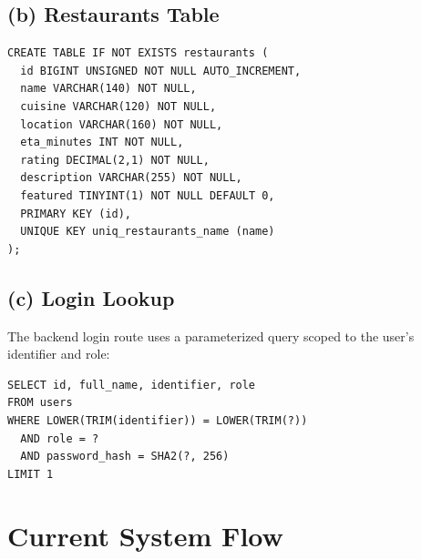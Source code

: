 \subsection*{(b) Restaurants Table}

\begin{tcolorbox}[colback=gray!5,colframe=black,title=Restaurants Table Schema]
\begin{verbatim}
CREATE TABLE IF NOT EXISTS restaurants (
  id BIGINT UNSIGNED NOT NULL AUTO_INCREMENT,
  name VARCHAR(140) NOT NULL,
  cuisine VARCHAR(120) NOT NULL,
  location VARCHAR(160) NOT NULL,
  eta_minutes INT NOT NULL,
  rating DECIMAL(2,1) NOT NULL,
  description VARCHAR(255) NOT NULL,
  featured TINYINT(1) NOT NULL DEFAULT 0,
  PRIMARY KEY (id),
  UNIQUE KEY uniq_restaurants_name (name)
);
\end{verbatim}
\end{tcolorbox}

\subsection*{(c) Login Lookup}

The backend login route uses a parameterized query scoped to the user's identifier and role:

\begin{tcolorbox}[colback=gray!5,colframe=black,title=Login Lookup]
\begin{verbatim}
SELECT id, full_name, identifier, role
FROM users
WHERE LOWER(TRIM(identifier)) = LOWER(TRIM(?))
  AND role = ?
  AND password_hash = SHA2(?, 256)
LIMIT 1
\end{verbatim}
\end{tcolorbox}

\section{Current System Flow}

